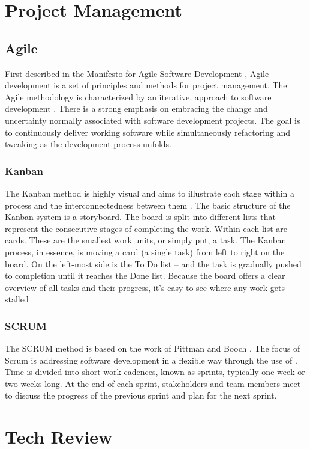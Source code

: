 
\section{Project Management}
\subsection{Agile}
First described in the Manifesto for Agile Software Development \cite{beck2001manifesto}, Agile development is a set of principles and methods for project management. The Agile methodology is characterized by an iterative, approach to software development \cite{cockburn2001agile}. There is a strong emphasis on embracing the change and uncertainty normally associated with software development projects. The goal is to continuously deliver working software while simultaneously refactoring and tweaking as the development process unfolds.  

\subsubsection{Kanban}
The Kanban method is highly visual and aims to illustrate each stage within a process and the interconnectedness between them \cite{sugimori1977toyota}. The basic structure of the Kanban system is a storyboard. The board is split into different lists that represent the consecutive stages of completing the work. Within each list are cards. These are the smallest work units, or simply put, a task. The Kanban process, in essence, is moving a card (a single task) from left to right on the board. On the left-most side is the To Do list – and the task is gradually pushed to completion until it reaches the Done list. Because the board offers a clear overview of all tasks and their progress, it’s easy to see where any work gets stalled

\subsubsection{SCRUM}
The SCRUM method is based on the work of Pittman and Booch \cite{pittman1993lessons}. The focus of Scrum is addressing software development in a flexible way through the use of . Time is divided into short work cadences, known as sprints, typically one week or two weeks long.  At the end of each sprint, stakeholders and team members meet to discuss the progress of the previous sprint and plan for the next sprint. 


\section{Tech Review}

